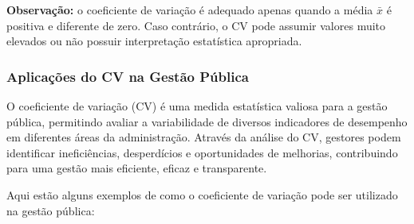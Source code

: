 \textbf{Observação:} o coeficiente de variação é adequado apenas quando a média
$\bar{x}$ é positiva e diferente de zero. Caso contrário, o CV pode assumir valores
muito elevados ou não possuir interpretação estatística apropriada.




\newpage
\subsubsection{Aplicações do CV na Gestão Pública} 

O coeficiente de variação (CV) é uma medida estatística valiosa para a gestão pública, permitindo avaliar a variabilidade de diversos indicadores de desempenho em diferentes áreas da administração. Através da análise do CV, gestores podem identificar ineficiências, desperdícios e oportunidades de melhorias, contribuindo para uma gestão mais eficiente, eficaz e transparente.\vskip0.3cm

Aqui estão alguns exemplos de como o coeficiente de variação pode ser utilizado na gestão pública:

